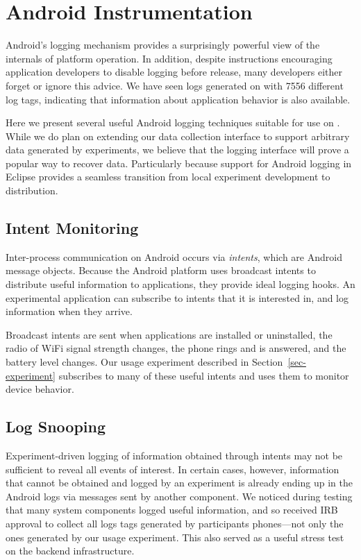 \section{Android Instrumentation}
\label{sec-logging}



Android's logging mechanism provides a surprisingly powerful view of the
internals of platform operation. In addition, despite instructions
encouraging application developers to disable logging before release, many
developers either forget or ignore this advice. We have seen logs generated
on \PhoneLab{} with \num{7556} different log tags, indicating that
information about application behavior is also available.

Here we present several useful Android logging techniques suitable for use on
\PhoneLab{}. While we do plan on extending our data collection interface to
support arbitrary data generated by experiments, we believe that the logging
interface will prove a popular way to recover data. Particularly because
support for Android logging in Eclipse provides a seamless transition from
local experiment development to \PhoneLab{} distribution.

\subsection{Intent Monitoring}

Inter-process communication on Android occurs via \textit{intents}, which are
Android message objects. Because the Android platform uses broadcast intents
to distribute useful information to applications, they provide ideal logging
hooks. An experimental application can subscribe to intents that it is
interested in, and log information when they arrive.

Broadcast intents are sent when applications are installed or uninstalled,
the radio of WiFi signal strength changes, the phone rings and is answered,
and the battery level changes. Our usage experiment described in
Section~\ref{sec-experiment} subscribes to many of these useful intents and
uses them to monitor device behavior.

\subsection{Log Snooping}

Experiment-driven logging of information obtained through intents may not be
sufficient to reveal all events of interest. In certain cases, however,
information that cannot be obtained and logged by an experiment is already
ending up in the Android logs via messages sent by another component. We
noticed during testing that many system components logged useful information,
and so received IRB approval to collect all logs tags generated by
participants phones---not only the ones generated by our usage experiment.
This also served as a useful stress test on the \PhoneLab{} backend
infrastructure.

